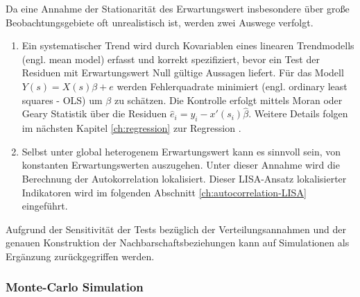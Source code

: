 Da eine Annahme der Stationarität des Erwartungswert insbesondere über große Beobachtungsgebiete oft unrealistisch ist, werden zwei Auswege verfolgt.
\begin{enumerate}
    \item Ein systematischer Trend wird durch Kovariablen eines linearen Trendmodells (engl. mean model) erfasst und korrekt spezifiziert, 
    bevor ein Test der Residuen mit Erwartungswert Null gültige Aussagen liefert. \cite[S.277]{bivand_applied_2013} 
    Für das Modell $Y(s)=X(s)\beta+e$ werden Fehlerquadrate minimiert (engl. ordinary least squares - OLS) um $\beta$ zu schätzen. 
    Die Kontrolle erfolgt mittels Moran oder Geary Statistik über die Residuen $\hat{e}_i=y_i-x\prime(s_i) \hat{\beta}$. 
    Weitere Details folgen im nächsten Kapitel \ref{ch:regression} zur Regression \cite[S.23]{schabenberger_statistical_2005}.
    \item  Selbst unter global heterogenem Erwartungswert kann es sinnvoll sein, von konstanten Erwartungswerten auszugehen. 
    Unter dieser Annahme wird die Berechnung der Autokorrelation lokalisiert. 
    Dieser LISA-Ansatz lokalisierter Indikatoren wird im folgenden Abschnitt \ref{ch:autocorrelation-LISA} eingeführt.
\end{enumerate}

Aufgrund der Sensitivität der Tests bezüglich der Verteilungsannahmen und der genauen Konstruktion der 
Nachbarschaftsbeziehungen kann auf Simulationen als Ergänzung zurückgegriffen werden.


\subsubsection{Monte-Carlo Simulation}

